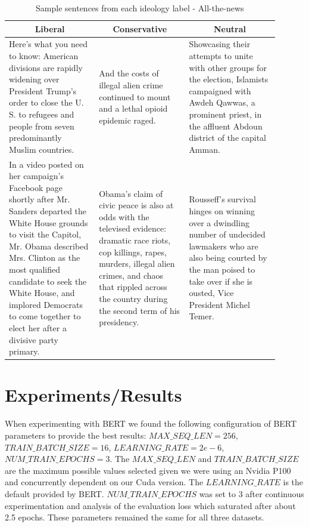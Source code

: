 \documentclass[10pt,a4paper,onecolumn]{article}
\begin{document}
\begin{table}[h!]
	\begin{center}
		\caption{Sample sentences from each ideology label - All-the-news	}
		\label{tab:atn-sentences}
		\begin{tabular}{p{0.3\linewidth}|p{0.3\linewidth}|p{0.3\linewidth}}
			\hline\hline
			\multicolumn{1}{c|}{\textbf{Liberal}} & \multicolumn{1}{c|}{\textbf{Conservative}} & \multicolumn{1}{c|}{\textbf{Neutral}}\\
			\hline
			Here’s what you need to know: American divisions are rapidly widening over President Trump’s order to close the U. S. to refugees and people from seven predominantly Muslim countries. & And the costs of illegal alien crime continued to mount and a lethal opioid epidemic raged. & Showcasing their attempts to unite with other groups for the election, Islamists campaigned with Awdeh Qawwas, a prominent priest, in the affluent Abdoun district of the capital Amman. \\
			In a video posted on her campaign’s Facebook page shortly after Mr. Sanders departed the White House grounds to visit the Capitol, Mr. Obama described Mrs. Clinton as the most qualified candidate to seek the White House, and implored Democrats to come together to elect her after a divisive party primary. & Obama’s claim of civic peace is also at odds with the televised evidence: dramatic race riots, cop killings, rapes, murders, illegal alien crimes, and chaos that rippled across the country during the second term of his presidency. & Rousseff’s survival hinges on winning over a dwindling number of undecided lawmakers who are also being courted by the man poised to take over if she is ousted, Vice President Michel Temer. \\
			\hline\hline
		\end{tabular}
	\end{center}
\end{table}

\section{Experiments/Results}
When experimenting with BERT we found the following configuration of BERT parameters to provide the best results: $MAX\_SEQ\_LEN = 256$, $TRAIN\_BATCH\_SIZE = 16$, $LEARNING\_RATE = 2e-6$, \newline
$NUM\_TRAIN\_EPOCHS = 3$. The $MAX\_SEQ\_LEN$ and $TRAIN\_BATCH\_SIZE$ are the maximum possible values selected given we were using an Nvidia P100 and concurrently dependent on our Cuda version. The $LEARNING\_RATE$ is the default provided by BERT. $NUM\_TRAIN\_EPOCHS$ was set to 3 after continuous experimentation and analysis of the evaluation loss which saturated after about 2.5 epochs. These parameters remained the same for all three datasets.
\end{document}
